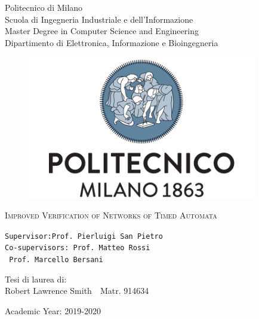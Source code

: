 \begin{titlepage}
	\bfseries{
		\begin{center}
			{\Large Politecnico di Milano\\}
			{\large
			Scuola di Ingegneria Industriale e dell'Informazione\\
			Master Degree in Computer Science and Engineering\\
			Dipartimento di Elettronica, Informazione e Bioingegneria\\}
		\end{center}
	
	}
	\vspace{1.0cm}
	\begin{figure}[h]
		\centering
		\includegraphics[width=10cm]{./frontpage/logo.png}
	\end{figure}
	\vspace{0.5cm}
	\begin{center}
		\textsc{\huge Improved Verification of Networks of Timed Automata}
	\end{center}
	\vspace{2cm}
	\begin{flushleft}
		\texttt{Supervisor:\quad\quad\quad Prof.~Pierluigi San Pietro \\
		  Co-supervisors: Prof.~Matteo Rossi \\
		\quad\quad\quad\quad\quad\quad\quad\quad\  Prof.~Marcello Bersani}
	\end{flushleft}
	\vspace{2cm}
	\begin{flushright}
		Tesi di laurea di:\\
		Robert Lawrence Smith\ \ Matr. 914634
	\end{flushright}
	\begin{center}
		Academic Year: 2019-2020 %
	\end{center}
\end{titlepage}
